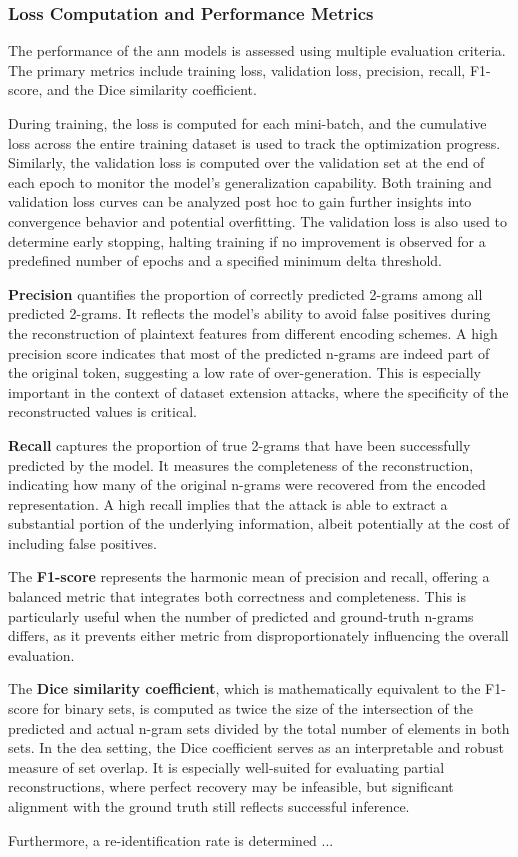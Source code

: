 \subsubsection{Loss Computation and Performance Metrics}

The performance of the \ac{ann} models is assessed using multiple evaluation criteria.
The primary metrics include training loss, validation loss, precision, recall, F1-score, and the Dice similarity coefficient.

During training, the loss is computed for each mini-batch, and the cumulative loss across the entire training dataset is used to track the optimization progress.
Similarly, the validation loss is computed over the validation set at the end of each epoch to monitor the model's generalization capability.
Both training and validation loss curves can be analyzed post hoc to gain further insights into convergence behavior and potential overfitting.
The validation loss is also used to determine early stopping, halting training if no improvement is observed for a predefined number of epochs and a specified minimum delta threshold.

\textbf{Precision} quantifies the proportion of correctly predicted 2-grams among all predicted 2-grams.
It reflects the model's ability to avoid false positives during the reconstruction of plaintext features from different encoding schemes.
A high precision score indicates that most of the predicted n-grams are indeed part of the original token, suggesting a low rate of over-generation.
This is especially important in the context of dataset extension attacks, where the specificity of the reconstructed values is critical.

\textbf{Recall} captures the proportion of true 2-grams that have been successfully predicted by the model.
It measures the completeness of the reconstruction, indicating how many of the original n-grams were recovered from the encoded representation.
A high recall implies that the attack is able to extract a substantial portion of the underlying information, albeit potentially at the cost of including false positives.

The \textbf{F1-score} represents the harmonic mean of precision and recall, offering a balanced metric that integrates both correctness and completeness.
This is particularly useful when the number of predicted and ground-truth n-grams differs, as it prevents either metric from disproportionately influencing the overall evaluation.

The \textbf{Dice similarity coefficient}, which is mathematically equivalent to the F1-score for binary sets, is computed as twice the size of the intersection of the predicted and actual n-gram sets divided by the total number of elements in both sets.
In the \ac{dea} setting, the Dice coefficient serves as an interpretable and robust measure of set overlap.
It is especially well-suited for evaluating partial reconstructions, where perfect recovery may be infeasible, but significant alignment with the ground truth still reflects successful inference.


Furthermore, a re-identification rate is determined ... %


